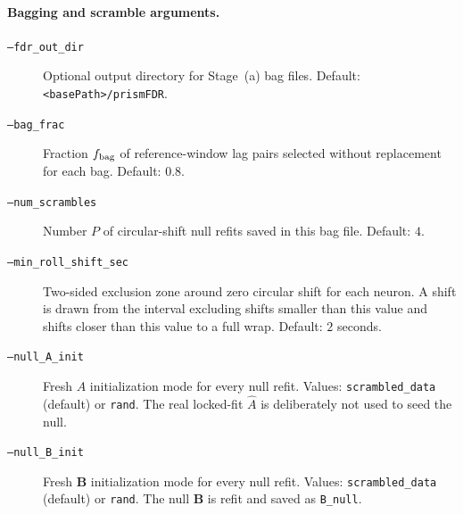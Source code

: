 \documentclass[11pt]{article}
\begin{document}
\paragraph{Bagging and scramble arguments.}
\begin{description}
  \item[\texttt{--fdr\_out\_dir}] Optional output directory for Stage~(a)
  bag files. Default: \texttt{<basePath>/prismFDR}.
  \item[\texttt{--bag\_frac}] Fraction \(f_{\rm bag}\) of reference-window
  lag pairs selected without replacement for each bag. Default: \(0.8\).
  \item[\texttt{--num\_scrambles}] Number \(P\) of circular-shift null
  refits saved in this bag file. Default: \(4\).
  \item[\texttt{--min\_roll\_shift\_sec}] Two-sided exclusion zone around
  zero circular shift for each neuron. A shift is drawn from the interval
  excluding shifts smaller than this value and shifts closer than this value
  to a full wrap. Default: \(2\) seconds.
  \item[\texttt{--null\_A\_init}] Fresh \(A\) initialization mode for every
  null refit. Values: \texttt{scrambled\_data} (default) or \texttt{rand}.
  The real locked-fit \(\hat A\) is deliberately not used to seed the null.
  \item[\texttt{--null\_B\_init}] Fresh \(\mathbf B\) initialization mode for
  every null refit. Values: \texttt{scrambled\_data} (default) or
  \texttt{rand}. The null \(\mathbf B\) is refit and saved as
  \texttt{B\_null}.
\end{description}
\end{document}
